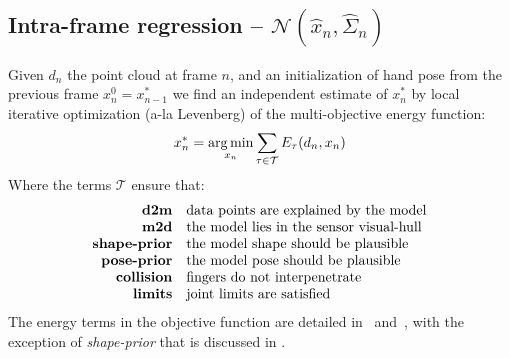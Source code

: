 \subsection{Intra-frame regression -- $\mathcal{N}(\hat{x}_n, \hat{\Sigma}_n)$}
\label{sec:independent}
% 
Given $d_n$ the point cloud at frame $n$, and an initialization of hand pose from the previous frame $x_n^0 = x_{n - 1}^*$ we find an independent estimate of $x_n^*$ by local iterative optimization (a-la Levenberg) of the multi-objective energy function:
% 
\begin{equation}
x_n^* = \operatorname*{arg\,min}_{x_n} \sum_{\tau \in \mathcal{T}} E_{\tau}(d_n, x_n) 
\label{eq:energies}
\end{equation}
% 
Where the terms $\mathcal{T}$ ensure that:
%
\begin{equation*}
\setlength{\jot}{0pt}
\begin{aligned}
\text{\textbf{d2m}} & \quad \text{data points are explained by the model} \\ 
\text{\textbf{m2d}} & \quad \text{the model lies in the sensor visual-hull} \\
\text{\textbf{shape-prior}} & \quad \text{the model shape should be plausible} \\
\text{\textbf{pose-prior}} & \quad \text{the model pose should be plausible} \\
\text{\textbf{collision}} & \quad \text{fingers do not interpenetrate} \\
\text{\textbf{limits}} & \quad \text{joint limits are satisfied}
\end{aligned}
\end{equation*}
The energy terms in the objective function are detailed in~\cite{tkach2016sphere} and~\cite{htrack}, with the exception of \emph{shape-prior} that is discussed in .


